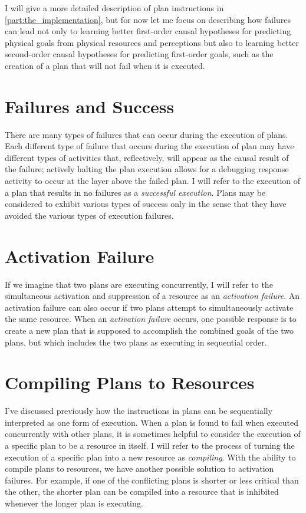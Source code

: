 I will give a more detailed description of plan instructions in
\autoref{part:the_implementation}, but for now let me focus on
describing how failures can lead not only to learning better
first-order causal hypotheses for predicting physical goals from
physical resources and perceptions but also to learning better
second-order causal hypotheses for predicting first-order goals, such
as the creation of a plan that will not fail when it is executed.

\section{Failures and Success}

There are many types of failures that can occur during the execution
of plans.  Each different type of failure that occurs during the
execution of plan may have different types of activities that,
reflectively, will appear as the causal result of the failure;
actively halting the plan execution allows for a debugging response
activity to occur at the layer above the failed plan.  I will refer to
the execution of a plan that results in no failures as a
\emph{successful execution}.  Plans may be considered to exhibit
various types of success only in the sense that they have avoided the
various types of execution failures.

\section{Activation Failure}

If we imagine that two plans are executing concurrently, I will refer
to the simultaneous activation and suppression of a resource as an
\emph{activation failure}.  An activation failure can also occur if
two plans attempt to simultaneously activate the same resource.  When
an \emph{activation failure} occurs, one possible response is to
create a new plan that is supposed to accomplish the combined goals of
the two plans, but which includes the two plans as executing in
sequential order.

\section{Compiling Plans to Resources}

I've discussed previously how the instructions in plans can be
sequentially interpreted as one form of execution.  When a plan is
found to fail when executed concurrently with other plans, it is
sometimes helpful to consider the execution of a specific plan to be a
resource in itself.  I will refer to the process of turning the
execution of a specific plan into a new resource as \emph{compiling}.
With the ability to compile plans to resources, we have another
possible solution to activation failures.  For example, if one of the
conflicting plans is shorter or less critical than the other, the
shorter plan can be compiled into a resource that is inhibited
whenever the longer plan is executing.

